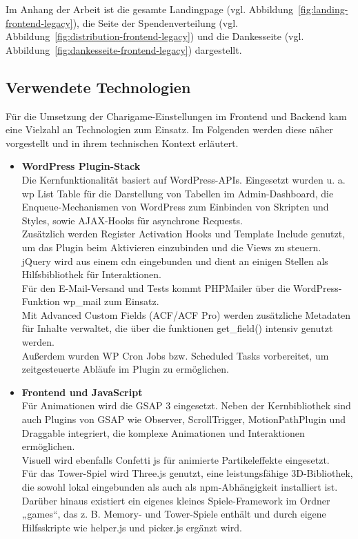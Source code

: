 Im Anhang der Arbeit ist die gesamte Landingpage (vgl. Abbildung~\ref{fig:landing-frontend-legacy}), die Seite der Spendenverteilung (vgl. Abbildung~\ref{fig:distribution-frontend-legacy}) und die Dankesseite (vgl. Abbildung~\ref{fig:dankesseite-frontend-legacy}) dargestellt.

\subsection{Verwendete Technologien}
Für die Umsetzung der Charigame-Einstellungen im Frontend und Backend kam eine Vielzahl an Technologien zum Einsatz.
Im Folgenden werden diese näher vorgestellt und in ihrem technischen Kontext erläutert.

\begin{itemize}
    \item \textbf{WordPress Plugin-Stack}\\
    Die Kernfunktionalität basiert auf WordPress-APIs.
    Eingesetzt wurden u. a. \gls{wp} List Table für die Darstellung von Tabellen im Admin-Dashboard, die Enqueue-Mechanismen von WordPress zum Einbinden von Skripten und Styles, sowie AJAX-Hooks für asynchrone Requests.\\
    Zusätzlich werden Register Activation Hooks und Template Include genutzt, um das Plugin beim Aktivieren einzubinden und die Views zu steuern.\\
    jQuery wird aus einem \gls{cdn} eingebunden und dient an einigen Stellen als Hilfsbibliothek für Interaktionen.\\
    Für den E-Mail-Versand und Tests kommt PHPMailer über die WordPress-Funktion wp\_mail zum Einsatz.\\
    Mit Advanced Custom Fields (ACF/ACF Pro) werden zusätzliche Metadaten für Inhalte verwaltet, die über die funktionen get\_field() intensiv genutzt werden.\\
    Außerdem wurden WP Cron Jobs bzw. Scheduled Tasks vorbereitet, um zeitgesteuerte Abläufe im Plugin zu ermöglichen.

    \item \textbf{Frontend und JavaScript}\\
    Für Animationen wird die \gls{GSAP} 3 eingesetzt.
    Neben der Kernbibliothek sind auch Plugins von GSAP wie Observer, ScrollTrigger, MotionPathPlugin und Draggable integriert, die komplexe Animationen und Interaktionen ermöglichen.\\
    Visuell wird ebenfalls Confetti \gls{js} für animierte Partikeleffekte eingesetzt.\\
    Für das Tower-Spiel wird Three.js genutzt, eine leistungsfähige 3D-Bibliothek, die sowohl lokal eingebunden als auch als \gls{npm}-Abhängigkeit installiert ist.\\
    Darüber hinaus existiert ein eigenes kleines Spiele-Framework im Ordner „games“, das z. B. Memory- und Tower-Spiele enthält und durch eigene Hilfsskripte wie helper.js und picker.js ergänzt wird.


\end{itemize}
